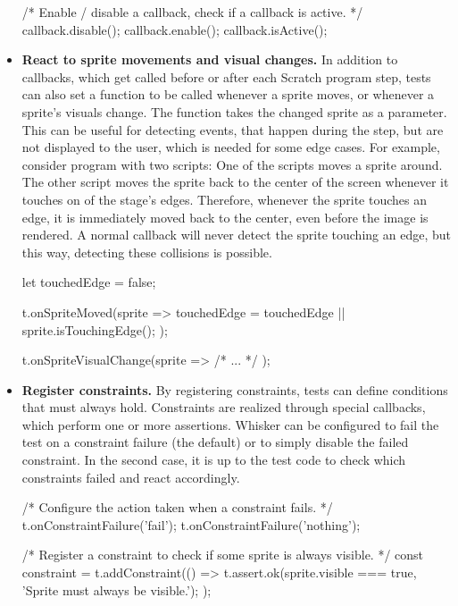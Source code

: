 \begin{itemize}
\begin{javascriptcode}
            /* Enable / disable a callback, check if a callback is active. */
            callback.disable();
            callback.enable();
            callback.isActive();
        \end{javascriptcode}
    \item \textbf{React to sprite movements and visual changes.}
        In addition to callbacks, which get called before or after each Scratch program step,
        tests can also set a function to be called whenever a sprite moves, or whenever a sprite's visuals change.
        The function takes the changed sprite as a parameter.
        This can be useful for detecting events, that happen during the step, but are not displayed to the user,
        which is needed for some edge cases.
        For example, consider program with two scripts:
        One of the scripts moves a sprite around.
        The other script moves the sprite back to the center of the screen whenever it touches on of the stage's edges.
        Therefore, whenever the sprite touches an edge, it is immediately moved back to the center,
        even before the image is rendered.
        A normal callback will never detect the sprite touching an edge,
        but this way, detecting these collisions is possible.
        \begin{javascriptcode}
            let touchedEdge = false;

            t.onSpriteMoved(sprite => {
                touchedEdge = touchedEdge || sprite.isTouchingEdge();
            });

            t.onSpriteVisualChange(sprite => { /* ... */ });
        \end{javascriptcode}
    \item \textbf{Register constraints.}
        By registering constraints, tests can define conditions that must always hold.
        Constraints are realized through special callbacks, which perform one or more assertions.
        Whisker can be configured to fail the test on a constraint failure (the default) or to simply disable the failed constraint.
        In the second case, it is up to the test code to check which constraints failed and react accordingly.
        \begin{javascriptcode}
            /* Configure the action taken when a constraint fails. */
            t.onConstraintFailure('fail');
            t.onConstraintFailure('nothing');

            /* Register a constraint to check if some sprite is always visible. */
            const constraint = t.addConstraint(() => {
                t.assert.ok(sprite.visible === true, 'Sprite must always be visible.');
            });


\end{javascriptcode}
\end{itemize}
